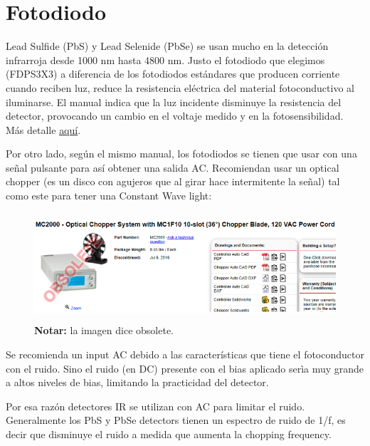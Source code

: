 \documentclass[titlepage,11pt]{article}
\begin{document}
\section{Fotodiodo}
Lead Sulfide (PbS) y Lead Selenide (PbSe) se usan mucho en la detección infrarroja desde 1000 nm hasta 4800 nm. 
Justo el fotodiodo que elegimos (FDPS3X3) a diferencia de los fotodiodos estándares que producen corriente cuando reciben luz, reduce la resistencia eléctrica del material fotoconductivo al iluminarse. El manual indica que la luz incidente disminuye la resistencia del detector, provocando un cambio en el voltaje medido y en la fotosensibilidad. Más detalle \href{https://www.thorlabs.com/drawings/53832b2035a4b665-C7A783DC-C708-1572-7544F10825D99274/FDPS3X3-Manual.pdf}{aquí}.

Por otro lado, según el mismo manual, los fotodiodos se tienen que usar con una señal pulsante para así obtener una salida AC. Recomiendan usar un optical chopper (es un disco con agujeros que al girar hace intermitente la señal) tal como este para tener una Constant Wave light:

\begin{figure}[htb!]
    \centering
    \includegraphics[height=4cm]{fig/wavechopper.png}
    \caption{\textbf{Notar:} la imagen dice obsolete.}
    \label{fig:wavchopper}
\end{figure}

Se recomienda un input AC debido a las características que tiene el fotoconductor con el ruido. Sino el ruido (en DC) presente con el bias aplicado serìa muy grande a altos niveles de bias, limitando la practicidad del detector.

Por esa razón detectores IR se utilizan con AC para limitar el ruido.
Generalmente los PbS y PbSe detectors tienen un espectro de ruido de 1/f, es decir que disminuye el ruido a medida que aumenta la chopping frequency.
\end{document}
